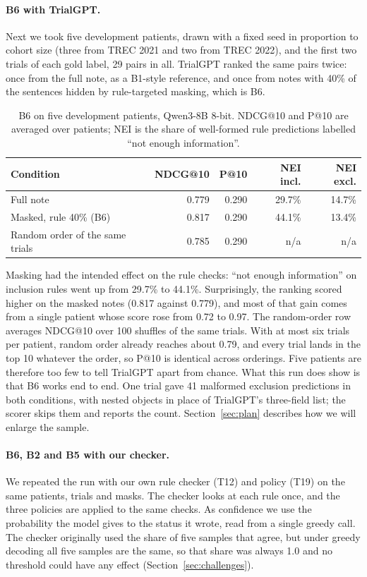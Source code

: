 \documentclass[10pt,a4paper,twocolumn]{article}
\begin{document}
\paragraph{B6 with TrialGPT.} Next we took five development patients, drawn with a fixed seed in proportion to cohort size (three from TREC 2021 and two from TREC 2022), and the first two trials of each gold label, 29 pairs in all. TrialGPT ranked the same pairs twice: once from the full note, as a B1-style reference, and once from notes with 40\% of the sentences hidden by rule-targeted masking, which is B6.

\begin{table}[H]
\centering\footnotesize
\begin{tabular}{@{}lrrrr@{}}
\toprule
\textbf{Condition} & \textbf{NDCG@10} & \textbf{P@10} & \textbf{NEI incl.} & \textbf{NEI excl.}\\
\midrule
Full note & 0.779 & 0.290 & 29.7\% & 14.7\%\\
Masked, rule 40\% (B6) & 0.817 & 0.290 & 44.1\% & 13.4\%\\
Random order of the same trials & 0.785 & 0.290 & n/a & n/a\\
\bottomrule
\end{tabular}
\caption{B6 on five development patients, Qwen3-8B 8-bit. NDCG@10 and P@10 are averaged over patients; NEI is the share of well-formed rule predictions labelled ``not enough information''.}
\label{tab:b6}
\end{table}

Masking had the intended effect on the rule checks: ``not enough information'' on inclusion rules went up from 29.7\% to 44.1\%. Surprisingly, the ranking scored higher on the masked notes (0.817 against 0.779), and most of that gain comes from a single patient whose score rose from 0.72 to 0.97. The random-order row averages NDCG@10 over 100 shuffles of the same trials. With at most six trials per patient, random order already reaches about 0.79, and every trial lands in the top 10 whatever the order, so P@10 is identical across orderings. Five patients are therefore too few to tell TrialGPT apart from chance. What this run does show is that B6 works end to end. One trial gave 41 malformed exclusion predictions in both conditions, with nested objects in place of TrialGPT's three-field list; the scorer skips them and reports the count. Section~\ref{sec:plan} describes how we will enlarge the sample.

\paragraph{B6, B2 and B5 with our checker.} We repeated the run with our own rule checker (T12) and policy (T19) on the same patients, trials and masks. The checker looks at each rule once, and the three policies are applied to the same checks. As confidence we use the probability the model gives to the status it wrote, read from a single greedy call. The checker originally used the share of five samples that agree, but under greedy decoding all five samples are the same, so that share was always 1.0 and no threshold could have any effect (Section~\ref{sec:challenges}).
\end{document}
